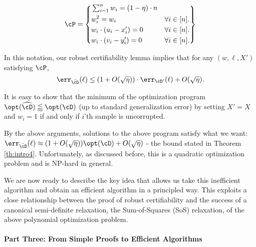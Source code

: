 \begin{equation}
  \cP = 
  \left \{
    \begin{aligned}
      & \textstyle\sum_{i=1}^n w_i
      = (1-\eta) \cdot n & &\\
      & w_i^2
      =w_i 
      &\forall i\in [n]. &\\
      & w_i \cdot (u_i - x'_i)
       = 0
      &\forall i\in [n]. &\\
      & w_i \cdot (v_i - y'_i)
      = 0
      &\forall i\in [n]. &%
    \end{aligned}
  \right \} \label{eq:introprogram}
\end{equation}

In this notation, our robust certifiability lemma implies that for any $(w,\ell,X')$ satisfying $\cP$, 
\begin{equation}\label{eq:intro1}
\err_{\hat{\cD}}(\ell) \leq (1 + O(\sqrt{\eta})) \cdot \err_{\cD'}(\ell) + O(\sqrt{\eta}).
\end{equation}

It is easy to show that the minimum of the optimization program $\opt(\widehat{\cD}) \lessapprox \opt(\cD)$ (up to standard generalization error) by setting $X' = X$ and $w_i = 1$ if and only if $i$'th sample is uncorrupted. 

By the above arguments, solutions to the above program satisfy what we want: $\err_{\hat{\cD}}(\ell) \approx (1+ O(\sqrt{\eta})) \opt(\cD) + O(\sqrt{\eta})$ - the bound stated in Theorem \ref{th:intro4}. Unfortunately, as discussed before, this is a quadratic optimization problem and is NP-hard in general. 

We are now ready to describe the key idea that allows us take this inefficient algorithm and obtain an efficient algorithm in a principled way. This exploits a close relationship between the proof of robust certifiability and the success of a canonical semi-definite relaxation, the Sum-of-Squares (SoS) relaxation, of the above polynomial optimization problem. %

\paragraph{Part Three: From Simple Proofs to Efficient Algorithms} %

